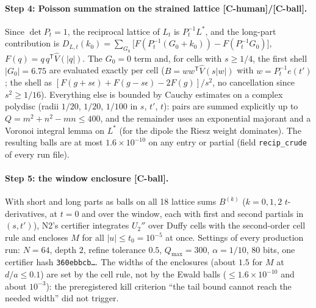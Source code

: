 \documentclass[11pt]{article}
\newcommand{\tier}[1]{\textsf{[#1]}}
\newcommand{\tCb}{\tier{C-ball}}
\newcommand{\tCh}{\tier{C-human}}
\begin{document}
\paragraph{Step 4: Poisson summation on the strained lattice \tCh/\tCb.} Since $\det P_t=1$, the reciprocal lattice of $L_t$ is $P_t^{-1}L^*$, and the long-part contribution is
$D_{L,t}(k_0)=\sum_{G_0}\bigl[F(P_t^{-1}(G_0+k_0))-F(P_t^{-1}G_0)\bigr]$, $F(q)=q\,q^{\mathsf T}\hat V(|q|)$. The $G_0=0$ term and, for cells with $s\ge1/4$, the first shell $|G_0|=6.75$ are evaluated exactly per cell ($B=ww^{\mathsf T}\hat V(s|w|)$ with $w=P_t^{-1}e(t')$; the shell as $[F(g+s\epsilon)+F(g-s\epsilon)-2F(g)]/s^2$, no cancellation since $s^2\ge1/16$). Everything else is bounded by Cauchy estimates on a complex polydisc (radii $1/20$, $1/20$, $1/100$ in $s$, $t'$, $t$): pairs are summed explicitly up to $Q=m^2+n^2-mn\le400$, and the remainder uses an exponential majorant and a Voronoi integral lemma on $L^*$ (for the dipole the Riesz weight dominates). The resulting balls are at most $1.6\times10^{-10}$ on any entry or partial (field \texttt{recip\_crude} of every run file).

\paragraph{Step 5: the window enclosure \tCb.} With short and long parts as balls on all 18 lattice sums $B^{(k)}$ ($k=0,1,2$ $t$-derivatives, at $t=0$ and over the window, each with first and second partials in $(s,t')$), N2's certifier integrates $U_2''$ over Duffy cells with the second-order cell rule and encloses $M$ for all $|u|\le t_0=10^{-5}$ at once. Settings of every production run: $N=64$, depth $2$, refine tolerance $0.5$, $Q_{\max}=300$, $\alpha=1/10$, $80$ bits, one certifier hash \texttt{360ebbcb\dots}. The widths of the enclosures (about $1.5$ for $M$ at $d/a\le0.1$) are set by the cell rule, not by the Ewald balls ($\le1.6\times10^{-10}$ and about $10^{-3}$): the preregistered kill criterion ``the tail bound cannot reach the needed width'' did not trigger.
\end{document}
